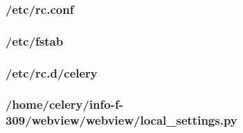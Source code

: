 \documentclass[10pt,a4paper]{article}
\begin{document}
\begin{appendices}
  \subsubsection{/etc/rc.conf}
  \label{subs:etc-rc-conf}
  

  \subsubsection{/etc/fstab}
  \label{subs:etc-fstab}
  

  \subsubsection{/etc/rc.d/celery}
  \label{subs:etc-rcd-celery}
  

  \subsubsection{/home/celery/info-f-309/webview/webview/local\_settings.py}
  \label{subs:webview-local-settings}
  
\end{appendices}
\end{document}
